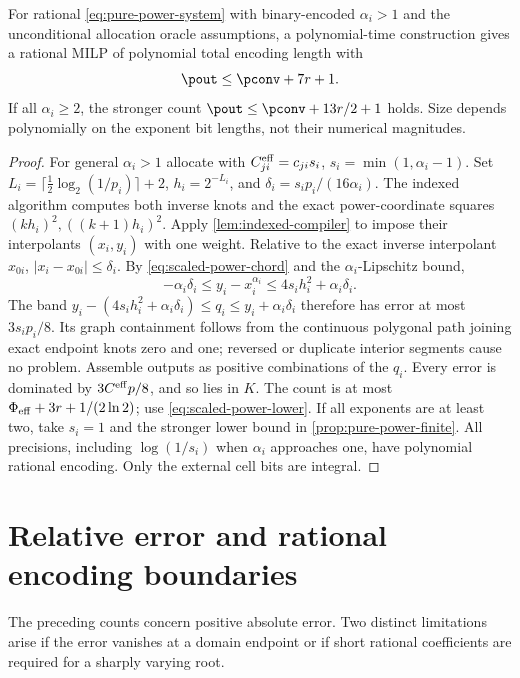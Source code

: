 \begin{theorem}\label{thm:rational-powers}
For rational \eqref{eq:pure-power-system} with binary-encoded
$\alpha_i>1$ and the unconditional allocation oracle assumptions,
a polynomial-time construction gives a rational MILP of polynomial
total encoding length with
\begin{equation}\label{eq:rational-power-count}
 \pout\le\pconv+7r+1.
\end{equation}
If all $\alpha_i\ge2$, the stronger count
$\pout\le\pconv+13r/2+1$ holds. Size depends polynomially on the
exponent bit lengths, not their numerical magnitudes.
\end{theorem}
\begin{proof}
For general $\alpha_i>1$ allocate with $C^{\rm eff}_{ji}=c_{ji}s_i$,
$s_i=\min(1,\alpha_i-1)$. Set
$L_i=\lceil\frac12\log_2(1/p_i)\rceil+2$,
$h_i=2^{-L_i}$, and $\delta_i=s_ip_i/(16\alpha_i)$.
The indexed algorithm computes both inverse knots and the exact
power-coordinate squares $(kh_i)^2,((k+1)h_i)^2$. Apply
\cref{lem:indexed-compiler} to impose their interpolants $(x_i,y_i)$
with one weight. Relative to the exact inverse interpolant $x_{0i}$,
$|x_i-x_{0i}|\le\delta_i$. By
\eqref{eq:scaled-power-chord} and the $\alpha_i$-Lipschitz bound,
\[
 -\alpha_i\delta_i\le y_i-x_i^{\alpha_i}
 \le4s_ih_i^2+\alpha_i\delta_i.
\]
The band
$y_i-(4s_ih_i^2+\alpha_i\delta_i)\le q_i
\le y_i+\alpha_i\delta_i$ therefore has error at most
$3s_ip_i/8$. Its graph containment follows from the continuous
polygonal path joining exact endpoint knots zero and one; reversed
or duplicate interior segments cause no problem. Assemble outputs
as positive combinations of the $q_i$. Every error is dominated by
$3C^{\rm eff}p/8$, and so lies in $K$.
The count is at most $\Phi_{\rm eff}+3r+1/(2\ln2)$; use
\eqref{eq:scaled-power-lower}. If all exponents are at least two,
take $s_i=1$ and the stronger lower bound in
\cref{prop:pure-power-finite}. All precisions, including
$\log(1/s_i)$ when $\alpha_i$ approaches one, have polynomial
rational encoding. Only the external cell bits are integral.
\end{proof}

\section{Relative error and rational encoding boundaries}
\label{sec:encoding-boundaries}

The preceding counts concern positive absolute error. Two distinct
limitations arise if the error vanishes at a domain endpoint or if
short rational coefficients are required for a sharply varying root.

